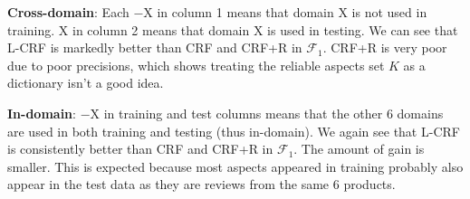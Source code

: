 \documentclass[11pt,a4paper]{article}
\theoremstyle{definition}
\begin{document}
       {\bf Cross-domain}: Each $-$X in column 1 means that domain X is not used in training. X in column 2 means that domain X is used in testing. We can see that L-CRF is markedly better than CRF and CRF+R in $\mathcal{F}_1$. CRF+R is very poor due to poor precisions, which shows treating the reliable aspects set $K$ as a dictionary isn't a good idea. 
        
        
       {\bf In-domain}: $-$X in training and test columns means that the other 6 domains are used in both training and testing (thus in-domain). We again see that L-CRF is consistently better than CRF and CRF+R in $\mathcal{F}_1$. The amount of gain is smaller. This is expected because most aspects appeared in training probably also appear in the test data as they are reviews from the same 6 products.
        
        
    
\end{document}
